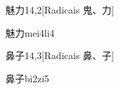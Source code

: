 \begin{entry}{魅力}{14,2}[Radicais ⿁、⼒]
  \begin{phonetics}{魅力}{mei4li4}
  \end{phonetics}
\end{entry}

\begin{entry}{鼻子}{14,3}[Radicais ⿐、⼦]
  \begin{phonetics}{鼻子}{bi2zi5}
  \end{phonetics}
\end{entry}


